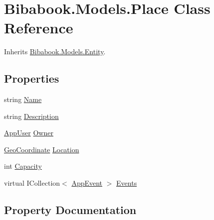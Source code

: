 \hypertarget{class_bibabook_1_1_models_1_1_place}{}\section{Bibabook.\+Models.\+Place Class Reference}
\label{class_bibabook_1_1_models_1_1_place}


Inherits \hyperlink{class_bibabook_1_1_models_1_1_entity}{Bibabook.\+Models.\+Entity}.

\subsection*{Properties}
\begin{DoxyCompactItemize}
\item 
string \hyperlink{class_bibabook_1_1_models_1_1_place_a204d1e81dc31a7c79513700b5fae0f93}{Name}
\item 
string \hyperlink{class_bibabook_1_1_models_1_1_place_aefc708df4c93671125ed8edb3ee5753a}{Description}
\item 
\hyperlink{class_bibabook_1_1_models_1_1_app_user}{App\+User} \hyperlink{class_bibabook_1_1_models_1_1_place_a0933e1aeb5aac0f402eb0025e2404632}{Owner}
\item 
\hyperlink{class_bibabook_1_1_models_1_1_geo_coordinate}{Geo\+Coordinate} \hyperlink{class_bibabook_1_1_models_1_1_place_a23dc2c01e45b6dcfc1950a68a657a693}{Location}
\item 
int \hyperlink{class_bibabook_1_1_models_1_1_place_a0266d1492cabb1dceb3705b0160d13b3}{Capacity}
\item 
virtual I\+Collection$<$ \hyperlink{class_bibabook_1_1_models_1_1_app_event}{App\+Event} $>$ \hyperlink{class_bibabook_1_1_models_1_1_place_abd888dd71ce43cefed859aea3e560f7b}{Events}
\end{DoxyCompactItemize}


\subsection{Property Documentation}
\hypertarget{class_bibabook_1_1_models_1_1_place_a0266d1492cabb1dceb3705b0160d13b3}{}
